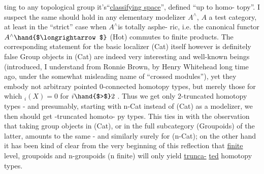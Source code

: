 
ting to any topological group it's``\uline{classifying space}'',  defined ``up to homo-%
topy''.  I suspect the same should hold in any elementary modelizer $A^{\wedge}$,
$A$ a test category,  at least in the ``strict'' case when $A^{\wedge}$\hand{/}is totally asphe-%
ric,  i.e.  the canonical functor  $A^{\wedge}\hand{$\longrightarrow$}$ (Hot)  commutes to finite products.
The corresponding statement for the basic localizer (Cat) itself however is
definitely false  Group objects in (Cat) are indeed very interesting and
well-known beings  (introduced,  I understand from Ronnie Brown, by Henry
Whitehead long time ago,  under the somewhat misleading name of ``crossed
modules''),  yet they embody not arbitrary pointed 0-connected homotopy
types,  but merely those for which \hand{$\pi$}$_i(X) = 0$ for $i \hand{$>$} 2$ .  Thus we get only
2-truncated homotopy types  -  and presumably,   starting with n-Cat
instead of (Cat) as a modelizer,  we then should get -truncated homoto-%
py types.  This ties in with the observation that taking group objects in
(Cat),  or in the full subcategory  (Groupoids)  of the latter,  amounts to
the same  -  and similarly surely for (n-Cat);  on the other hand it has
been kind of clear from the very beginning of this reflection that 
\uline{finite} level,  groupoids and n-groupoids (n finite) will only yield \uline{trunca-}%
\uline{ted} homotopy types.

